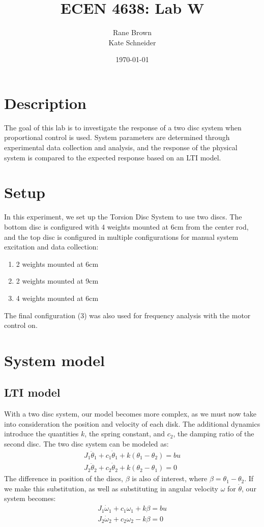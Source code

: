 \documentclass[11pt,titlepage]{article}
\author{Rane Brown \\ Kate Schneider}
\title{ECEN 4638: Lab W}
\date{\today}
\begin{document}
\maketitle
\tableofcontents
\listoffigures
\listoftables
\newpage

\section{Description}
The goal of this lab is to investigate the response of a two disc system when proportional control is used. System parameters are determined through experimental data collection and analysis, and the response of the physical system is compared to the expected response based on an LTI model.

\section{Setup}
In this experiment, we set up the Torsion Disc System to use two discs. The bottom disc is configured with 4 weights mounted at 6cm from the center rod, and the top disc is configured in multiple configurations for manual system excitation and data collection:
\begin{enumerate}
	\item 2 weights mounted at 6cm
	\item 2 weights mounted at 9cm
	\item 4 weights mounted at 6cm
\end{enumerate}
The final configuration (3) was also used for frequency analysis with the motor control on.

\section{System model}
	\subsection{LTI model}	
	With a two disc system, our model becomes more complex, as we must now take into consideration the position and velocity of each disk. The additional dynamics introduce the quantities $k$, the spring constant, and $c_2$, the damping ratio of the second disc. The two disc system can be modeled as:
	\begin{align}
		J_1\ddot \theta_1+c_1\dot \theta_1+k(\theta_1-\theta_2)=bu \\
		J_2\ddot \theta_2+c_2\dot \theta_2+k(\theta_2-\theta_1)=0
	\end{align}
	 The difference in position of the discs, $\beta$ is also of interest, where $\beta = \theta_1-\theta_2$. If we make this substitution, as well as substituting in angular velocity $\omega$ for $\dot \theta$, our system becomes:
	 \begin{align}
	 	J_1\dot \omega_1+c_1\omega_1+k\beta=bu \\
		J_2\dot \omega_2+c_2\omega_2-k\beta=0
	 \end{align}
	 
\end{document}
